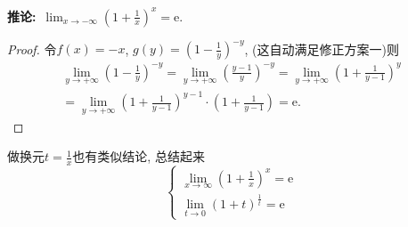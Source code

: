 \noindent
\textbf{推论:}\ $\displaystyle \lim_{x \to -\infty} \left( 1 + \frac{1}{x} \right) ^{x} = \mathrm{e}$.
\begin{proof}
    令$f \left( x \right) = -x$, $g \left( y \right) = \left( 1 - \frac{1}{y} \right) ^{-y}$, (这自动满足修正方案一)则 
    \begin{equation}
        \begin{gathered}
            \lim_{y \to +\infty} \left( 1 - \frac{1}{y} \right) ^{-y} 
            = \lim_{y \to +\infty}\left( \frac{y-1}{y} \right) ^{-y} 
            = \lim_{y \to +\infty} \left( 1 + \frac{1}{y-1} \right) ^{y} 
            \\
            = \lim_{y \to +\infty} \left( 1 + \frac{1}{y-1} \right) ^{y-1} \cdot \left( 1 + \frac{1}{y -1} \right) = \mathrm{e}.
        \end{gathered}
    \end{equation}
\end{proof}

做换元$t = \frac{1}{x}$也有类似结论, 总结起来
\begin{equation}
  \begin{cases}
    \displaystyle \lim_{x \to \infty} \left( 1 + \frac{1}{x} \right) ^{x} = \mathrm{e} 
    \\ 
    \displaystyle \lim_{t \to 0} \left( 1 + t \right) ^{\frac{1}{t}} = \mathrm{e}
  \end{cases}
\end{equation}

